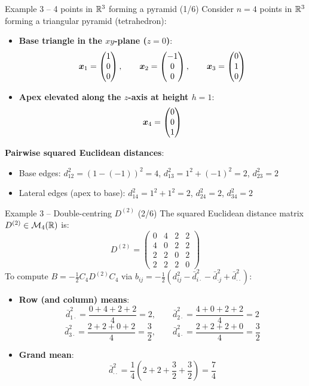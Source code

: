 \documentclass[aspectratio=169]{beamer}\usepackage[]{graphicx}\usepackage[]{xcolor}
\begin{document}
\begin{frame}{Example 3 -- 4 points in $\mathbb{R}^3$ forming a pyramid (1/6)}
Consider $n = 4$ points in $\mathbb{R}^3$ forming a triangular pyramid (tetrahedron):
\vfill
\begin{itemize}
\item \textbf{Base triangle in the $xy$-plane ($z=0$)}:
\[
\bm{x}_1 = \begin{pmatrix} 1 \\ 0 \\ 0 \end{pmatrix}, \qquad
\bm{x}_2 = \begin{pmatrix} -1 \\ 0 \\ 0 \end{pmatrix}, \qquad
\bm{x}_3 = \begin{pmatrix} 0 \\ 1 \\ 0 \end{pmatrix}
\]
\item \textbf{Apex elevated along the $z$-axis at height $h = 1$}:
\[
\bm{x}_4 = \begin{pmatrix} 0 \\ 0 \\ 1 \end{pmatrix}
\]
\end{itemize}
\vfill
\textbf{Pairwise squared Euclidean distances}:
\begin{itemize}
\item Base edges: $d_{12}^2 = (1 - (-1))^2 = 4$, \quad $d_{13}^2 = 1^2 + (-1)^2 = 2$, \quad $d_{23}^2 = 2$
\item Lateral edges (apex to base): $d_{14}^2 = 1^2 + 1^2 = 2$, \quad $d_{24}^2 = 2$, \quad $d_{34}^2 = 2$
\end{itemize}
\end{frame}

\begin{frame}{Example 3 -- Double-centring $D^{(2)}$ (2/6)}
The squared Euclidean distance matrix $D^{(2)} \in \mathcal{M}_4(\mathbb{R})$ is:
\[
D^{(2)} = \begin{pmatrix}
0 & 4 & 2 & 2 \\
4 & 0 & 2 & 2 \\
2 & 2 & 0 & 2 \\
2 & 2 & 2 & 0
\end{pmatrix}
\]
\vfill
To compute $B = -\frac{1}{2} C_4 D^{(2)} C_4$ via $b_{ij} = -\frac{1}{2}(d_{ij}^2 - \bar{d}_{i\cdot}^2 - \bar{d}_{\cdot j}^2 + \bar{d}_{\cdot\cdot}^2)$:
\vfill
\begin{itemize}
\item \textbf{Row (and column) means}:
\[
\bar{d}_{1\cdot}^2 = \frac{0 + 4 + 2 + 2}{4} = 2, \qquad
\bar{d}_{2\cdot}^2 = \frac{4 + 0 + 2 + 2}{4} = 2
\]
\[
\bar{d}_{3\cdot}^2 = \frac{2 + 2 + 0 + 2}{4} = \frac{3}{2}, \qquad
\bar{d}_{4\cdot}^2 = \frac{2 + 2 + 2 + 0}{4} = \frac{3}{2}
\]
\item \textbf{Grand mean}:
\[
\bar{d}_{\cdot\cdot}^2 = \frac{1}{4}\left(2 + 2 + \frac{3}{2} + \frac{3}{2}\right) = \frac{7}{4}
\]
\end{itemize}
\end{frame}
\end{document}
